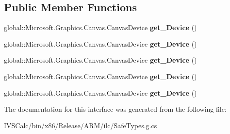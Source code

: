 \subsection*{Public Member Functions}
\begin{DoxyCompactItemize}
\item 
\mbox{\label{interface_microsoft_1_1_graphics_1_1_canvas_1_1_geometry_1_1_i_canvas_cached_geometry_a574982453fad60b71161f8a32f4feead}} 
global\+::\+Microsoft.\+Graphics.\+Canvas.\+Canvas\+Device {\bfseries get\+\_\+\+Device} ()
\item 
\mbox{\label{interface_microsoft_1_1_graphics_1_1_canvas_1_1_geometry_1_1_i_canvas_cached_geometry_a574982453fad60b71161f8a32f4feead}} 
global\+::\+Microsoft.\+Graphics.\+Canvas.\+Canvas\+Device {\bfseries get\+\_\+\+Device} ()
\item 
\mbox{\label{interface_microsoft_1_1_graphics_1_1_canvas_1_1_geometry_1_1_i_canvas_cached_geometry_a574982453fad60b71161f8a32f4feead}} 
global\+::\+Microsoft.\+Graphics.\+Canvas.\+Canvas\+Device {\bfseries get\+\_\+\+Device} ()
\item 
\mbox{\label{interface_microsoft_1_1_graphics_1_1_canvas_1_1_geometry_1_1_i_canvas_cached_geometry_a574982453fad60b71161f8a32f4feead}} 
global\+::\+Microsoft.\+Graphics.\+Canvas.\+Canvas\+Device {\bfseries get\+\_\+\+Device} ()
\item 
\mbox{\label{interface_microsoft_1_1_graphics_1_1_canvas_1_1_geometry_1_1_i_canvas_cached_geometry_a574982453fad60b71161f8a32f4feead}} 
global\+::\+Microsoft.\+Graphics.\+Canvas.\+Canvas\+Device {\bfseries get\+\_\+\+Device} ()
\end{DoxyCompactItemize}


The documentation for this interface was generated from the following file\+:\begin{DoxyCompactItemize}
\item 
I\+V\+S\+Calc/bin/x86/\+Release/\+A\+R\+M/ilc/Safe\+Types.\+g.\+cs\end{DoxyCompactItemize}

